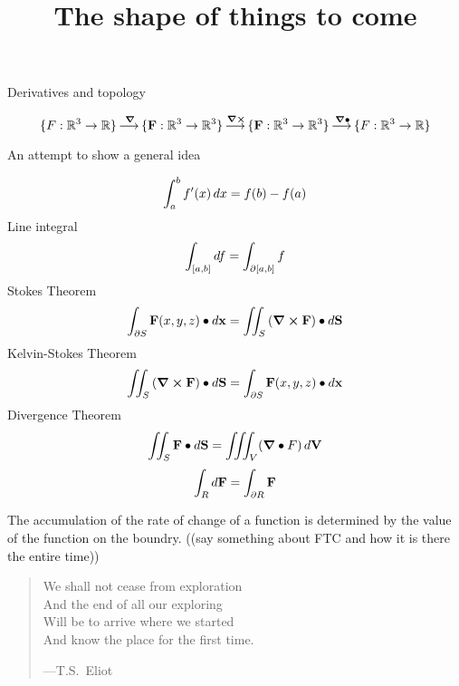 \documentclass{ximera}
\title[Dig-In:]{The shape of things to come}
\begin{document}
\begin{abstract}
\end{abstract}
\maketitle


Derivatives and topology


\[
\{F:\mathbb R^3 \to \mathbb R\} \mathop{\longrightarrow\,}\limits^{\boldsymbol\nabla} \{\mathbf{F}: \mathbb R^3 \to \mathbb R^3\} \mathop{\longrightarrow\,}\limits^{\boldsymbol\nabla\boldsymbol\times}
\{\mathbf{F}:\mathbb R^3 \to \mathbb R^3\} \mathop{\longrightarrow\,}\limits^{\boldsymbol\nabla\bullet} \{F:\mathbb R^3 \to \mathbb R\}
\]

An attempt to show a general idea

\[
\int_a^b f'(x) \mathop{}\!d x = f(b) - f(a)
\]
Line integral
\[
\int_{[a,b]} \mathop{}\!d f = \int_{\partial[a,b]} f
\]
Stokes Theorem
\[
\int_{\partial S} \mathbf{F}(x,y,z)\bullet \mathop{}\!d \mathbf{x} = \iint_S \left(\boldsymbol\nabla\boldsymbol\times\mathbf{F}\right)\bullet \mathop{}\!d \mathbf{S}
\]
Kelvin-Stokes Theorem
\[
\iint_S \left(\boldsymbol\nabla\boldsymbol\times\mathbf{F}\right)\bullet \mathop{}\!d \mathbf{S} = \int_{\partial S} \mathbf{F}(x,y,z)\bullet \mathop{}\!d \mathbf{x}
\]
Divergence Theorem
\[
\iint_S \mathbf{F}\bullet \mathop{}\!d \mathbf{S} = \iiint_V (\boldsymbol\nabla\bullet F) \mathop{}\!d \mathbf{V}
\]
\[
\int_R \mathop{}\!d \mathbf{F} = \int_{\partial R} \mathbf{F}
\]

The accumulation of the rate of change of a function is determined by
the value of the function on the boundry. ((say something about FTC and how it is there the entire time))

\begin{quote}
  We shall not cease from exploration\\
  And the end of all our exploring \\
  Will be to arrive where we started \\
  And know the place for the first time.

  \hfill ---T.S.\ Eliot
\end{quote}
\end{document}
